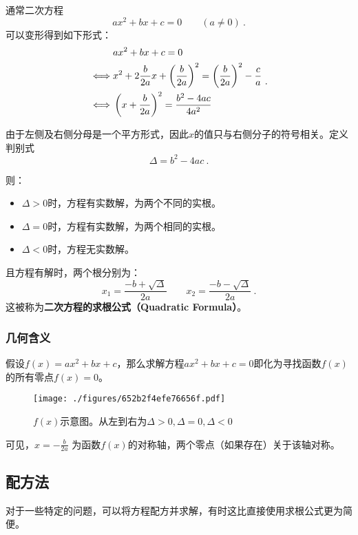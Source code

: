 

通常二次方程
\begin{equation}
ax^2+bx+c=0 \qquad (a\neq 0)~.
\end{equation}
可以变形得到如下形式：
\begin{equation}
\begin{split}
 & ax^2+bx+c = 0 \\ 
\iff&x^2+2{b\over 2a} x+\left({b\over 2a}\right)^2 = \left({b\over 2a}\right)^2-{c\over a} \\ 
\iff&\left(x+{b\over 2a}\right)^2 = {b^2-4ac\over 4a^2} \\ 
\end{split}~.
\end{equation}

由于左侧及右侧分母是一个平方形式，因此$x$的值只与右侧分子的符号相关。定义判别式
\begin{equation}
\Delta = b^2-4ac~.
\end{equation}

则：
\begin{itemize}
\item $\Delta > 0$时，方程有实数解，为两个不同的实根。
\item $\Delta = 0$时，方程有实数解，为两个相同的实根。
\item $\Delta < 0$时，方程无实数解。
\end{itemize}

且方程有解时，两个根分别为：
\begin{equation}
x_1=\frac{-b+\sqrt{\Delta}}{2a}\qquad x_2=\frac{-b-\sqrt{\Delta}}{2a}~.
\end{equation}
这被称为\textbf{二次方程的求根公式（Quadratic Formula）}。



\subsubsection{几何含义}
假设$f(x)=ax^2+bx+c$，那么求解方程$ax^2+bx+c=0$即化为寻找函数$f(x)$的所有零点$f(x)=0$。
\begin{figure}[ht]
\centering
\texttt{[image: ./figures/652b2f4efe76656f.pdf]}
\caption{$f(x)$示意图。从左到右为$\Delta > 0, \Delta = 0, \Delta < 0$} \label{fig_quasol_1}
\end{figure}
可见，$x=-\frac{b}{2a}$ 为函数$f(x)$的对称轴，两个零点（如果存在）关于该轴对称。

\subsection{配方法}
对于一些特定的问题，可以将方程配方并求解，有时这比直接使用求根公式更为简便。


